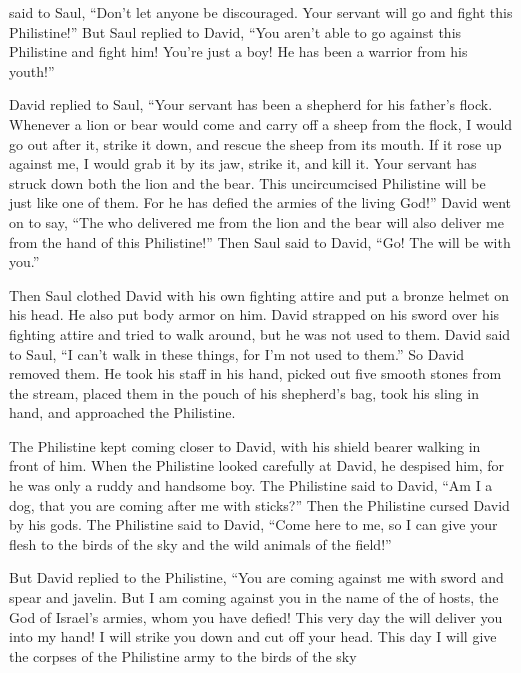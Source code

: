 {said
to
Saul,
“Don’t
let anyone
be discouraged.
Your servant
will go
and fight
this
Philistine!”
But Saul
replied
to
David,
“You aren’t
able
to go
against
this
Philistine
and fight
him! You’re just
a boy! He has been a warrior
from his youth!”
\par }{\PP {}David
replied
to
Saul,
“Your servant
has been a shepherd
for his father’s
flock.
Whenever a lion
or bear
would come
and carry off
a sheep
from the flock,
I would go out
after
it, strike
it down, and rescue
the sheep from its mouth.
If it rose
up against
me,
I would grab
it by its jaw,
strike
it, and kill it.
Your servant
has struck
down both
the lion
and the bear.
This
uncircumcised
Philistine
will be
just like one
of them.
For
he has defied
the armies
of the living
God!”
David
went on to say,
“The
{}
who
delivered
me from the lion
and the bear
will also deliver
me from the hand
of this
Philistine!” Then Saul
said to
David,
“Go! The
{}
will be
with you.”
\par }{\PP {}Then Saul
clothed
David
with his own fighting attire
and put
a bronze
helmet
on
his head.
He also put
body armor on him.
David
strapped
on his sword
over
his fighting attire
and tried
to walk
around, but
he was not
used
to them. David
said
to
Saul,
“I can’t
walk
in these
things, for
I’m not
used
to them.” So David
removed them.
He took
his staff
in his hand,
picked
out five
smooth
stones
from
the stream,
placed
them in the pouch
of his shepherd’s
bag,
took his sling
in
hand,
and approached
the Philistine.
\par }{\PP The Philistine
kept coming closer
to
David,
with his shield
bearer
walking in front of him.
When
the Philistine
looked
carefully at David,
he despised
him, for
he was
only a ruddy
and
handsome
boy.
The Philistine
said
to
David,
“Am
I a dog,
that
you
are coming
after me with sticks?” Then the Philistine
cursed
David
by his gods.
The Philistine
said
to
David,
“Come
here to me,
so I can give
your flesh
to the birds
of the sky
and the wild animals
of the field!”
\par }{\PP {}But David
replied
to
the Philistine,
“You
are coming
against me
with sword
and spear
and javelin.
But I am
coming
against you in the name
of the {}
of hosts,
the God
of Israel’s
armies,
whom
you have defied!
This very
day
the {}
will deliver
you into my hand! I will strike
you down and cut off
your head.
This
day
I will give
the corpses
of the Philistine
army
to the birds
of the sky
}
